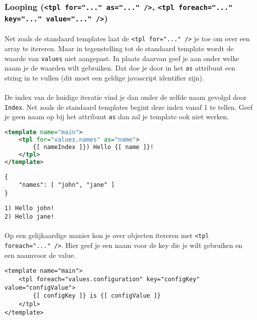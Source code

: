 \subsubsection {Looping (\lstinline{<tpl for="..." as="..." />}, \lstinline{<tpl foreach="..." key="..." value="..." />})}

\paragraph {} Net zoals de standaard templates laat de \lstinline{<tpl for="..." />} je
toe om over een array te itereren. Maar in tegenstelling tot de standaard template wordt de
waarde van \lstinline{values} niet aangepast. In plaats daarvan geef je aan onder welke
naam je de waarden wilt gebruiken. Dat doe je door in het \lstinline{as} attribuut een
string in te vullen (dit moet een geldige javascript identifier zijn).

\paragraph {} De index van de huidige iteratie vind je dan onder de zelfde naam gevolgd
door \lstinline{Index}. Net zoals de standaard templates begint deze index vanaf 1 te
tellen. Geef je geen naam op bij het attribuut \lstinline{as} dan zal je template ook niet
werken.

\begin{lstlisting}[language=xml]
<template name="main">
	<tpl for="values.names" as="name">
		{[ nameIndex ]}) Hello {[ name ]}!
	</tpl>
</template>
\end{lstlisting}

\begin{lstlisting}
{
	"names": [ "john", "jane" ]
}
\end{lstlisting}

\begin{lstlisting}
1) Hello john!
2) Hello jane!
\end{lstlisting}

\paragraph {} Op een gelijkaardige manier kon je over objecten itereren met
\lstinline{<tpl foreach="..." />}. Hier geef je een naam voor de key
die je wilt gebruiken en een naamvoor de value.

\begin{lstlisting}
<template name="main">
	<tpl foreach="values.configuration" key="configKey" value="configValue">
		{[ configKey ]} is {[ configValue ]}
	</tpl>
</template>
\end{lstlisting}

